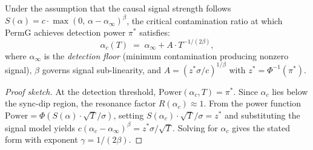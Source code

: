 \begin{proposition}
\label{prop:phase-boundary}
Under the assumption that the causal signal strength follows
$S(\alpha) = c \cdot \max(0,\, \alpha - \alpha_\infty)^\beta$,
the critical contamination ratio at which PermG achieves detection power $\pi^*$ satisfies:
\begin{equation}
\alpha_c(T) \;=\; \alpha_\infty + A \cdot T^{-1/(2\beta)},
\end{equation}
where $\alpha_\infty$ is the \emph{detection floor} (minimum contamination producing nonzero signal),
$\beta$ governs signal sub-linearity, and $A = (z^* \sigma / c)^{1/\beta}$ with
$z^* = \Phi^{-1}(\pi^*)$.
\end{proposition}

\begin{proof}[Proof sketch]
At the detection threshold, $\text{Power}(\alpha_c, T) = \pi^*$. Since $\alpha_c$ lies
below the sync-dip region, the resonance factor $R(\alpha_c) \approx 1$. From the power
function $\text{Power} = \Phi(S(\alpha) \cdot \sqrt{T} / \sigma)$, setting
$S(\alpha_c) \cdot \sqrt{T} / \sigma = z^*$ and substituting the signal model yields
$c (\alpha_c - \alpha_\infty)^\beta = z^* \sigma / \sqrt{T}$. Solving for $\alpha_c$
gives the stated form with exponent $\gamma = 1/(2\beta)$.
\end{proof}

